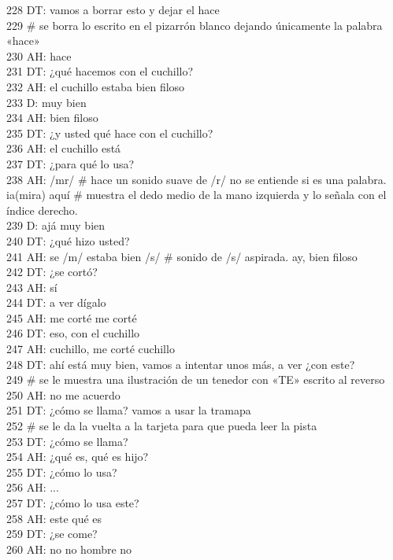 228 DT: vamos a borrar esto y dejar el hace\\
229 # se borra lo escrito en el pizarrón blanco dejando únicamente la palabra «hace»\\
230 AH: hace\\
231 DT: ¿qué hacemos con el cuchillo?\\
232 AH: el cuchillo estaba bien filoso\\
233 D: muy bien\\
234 AH: bien filoso\\
235 DT: ¿y usted qué hace con el cuchillo?\\
236 AH: el cuchillo está\\
237 DT: ¿para qué lo usa?\\
238 AH: /mr/ # hace un sonido suave de /r/ no se entiende si es una palabra. ia(mira) aquí # muestra el dedo medio de la mano izquierda y lo señala con el índice derecho.\\
239 D: ajá muy bien\\
240 DT: ¿qué hizo usted?\\
241 AH: se /m/ estaba bien /s/ # sonido de /s/ aspirada. ay, bien filoso\\
242 DT: ¿se cortó?\\
243 AH: sí\\
244 DT: a ver dígalo\\
245 AH: me corté me corté\\
246 DT: eso, con el cuchillo\\
247 AH: cuchillo, me corté cuchillo\\
248 DT: ahí está muy bien, vamos a intentar unos más, a ver ¿con este?\\
249 # se le muestra una ilustración de un tenedor con «TE» escrito al reverso\\
250 AH: no me acuerdo\\
251 DT: ¿cómo se llama? vamos a usar la tramapa\\
252 # se le da la vuelta a la tarjeta para que pueda leer la pista\\
253 DT: ¿cómo se llama?\\
254 AH: ¿qué es, qué es hijo?\\
255 DT: ¿cómo lo usa?\\
256 AH: ...\\
257 DT: ¿cómo lo usa este?\\
258 AH: este qué es\\
259 DT: ¿se come?\\
260 AH: no no hombre no\\
